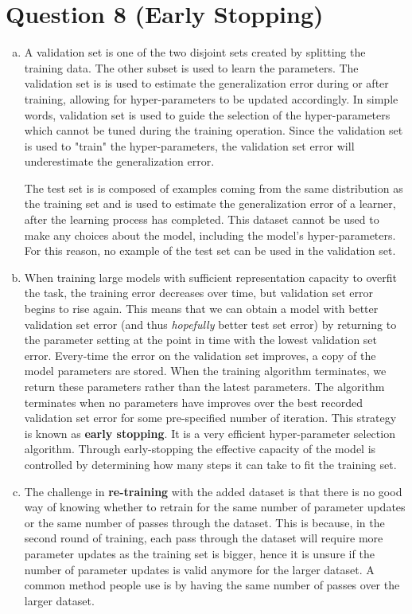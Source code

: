 \documentclass[fleqn]{article}
\begin{document}
\section*{Question 8 (Early Stopping)}
\begin{enumerate}[a)]
	\item 
	A validation set is one of the two disjoint sets created by splitting the training data. The other subset is used to learn the parameters. The validation set is is used to estimate the generalization error during or after training, allowing for hyper-parameters to be updated accordingly. In simple words, validation set is used to guide the selection of the hyper-parameters which cannot be tuned during the training operation. Since the validation set is used to "train" the hyper-parameters, the validation set error will underestimate the generalization error.
	
	The test set is is composed of examples coming from the same distribution as the training set and is used to estimate the generalization error of a learner, after the learning process has completed. This dataset cannot be used to make any choices about the model, including the model's hyper-parameters. For this reason, no example of the test set can be used in the validation set.
	
	\item 
	When training large models with sufficient representation capacity to overfit the task, the training error decreases over time, but validation set error begins to rise again. %
	\vspace{40mm}
	This means that we can obtain a model with better validation set error (and thus \textit{hopefully} better test set error) by returning to the parameter setting at the point in time with the lowest validation set error. Every-time the error on the validation set improves, a copy of the model parameters are stored. When the training algorithm terminates, we return these parameters rather than the latest parameters. The algorithm terminates when no parameters have improves over the best recorded validation set error for some pre-specified number of iteration. This strategy is known as \textbf{early stopping}. It is a very efficient hyper-parameter selection algorithm. Through early-stopping the effective capacity of the model is controlled by determining how many steps it can take to fit the training set.
	
	\item 
	The challenge in \textbf{re-training} with the added dataset is that there is no good way of knowing whether to retrain for the same number of parameter updates or the same number of passes through the dataset. This is because, in the second round of training, each pass through the dataset will require more parameter updates as the training set is bigger, hence it is unsure if the number of parameter updates is valid anymore for the larger dataset. A common method people use is by having the same number of passes over the larger dataset.
	

\end{enumerate}
\end{document}

